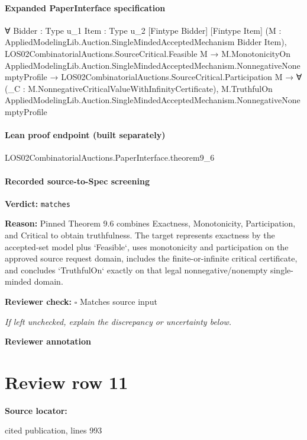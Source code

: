 \documentclass[10pt]{article}
\newcommand{\reviewerbox}{%
  \par\noindent\fbox{\parbox{0.96\linewidth}{\rule{0pt}{0.38in}}}\par
}
\newcommand{\reviewmatch}[1]{%
  \par\noindent\textbf{Reviewer check:} $\square$\; #1\par
  \noindent\emph{If left unchecked, explain the discrepancy or uncertainty below.}\par
}
\begin{document}
\paragraph{Expanded PaperInterface specification}
\begin{ReviewVerbatim}
∀ {Bidder : Type u_1} {Item : Type u_2} [Fintype Bidder] [Fintype Item]
  (M : AppliedModelingLib.Auction.SingleMindedAcceptedMechanism Bidder Item),
  LOS02CombinatorialAuctions.SourceCritical.Feasible M →
    M.MonotonicityOn AppliedModelingLib.Auction.SingleMindedAcceptedMechanism.NonnegativeNonemptyProfile →
      LOS02CombinatorialAuctions.SourceCritical.Participation M →
        ∀ (_C : M.NonnegativeCriticalValueWithInfinityCertificate),
          M.TruthfulOn AppliedModelingLib.Auction.SingleMindedAcceptedMechanism.NonnegativeNonemptyProfile
\end{ReviewVerbatim}



\paragraph{Lean proof endpoint (built separately)}\begin{ReviewVerbatim}
LOS02CombinatorialAuctions.PaperInterface.theorem9_6
\end{ReviewVerbatim}

\paragraph{Recorded source-to-Spec screening}
\textbf{Verdict:} \texttt{matches}
\\
{\raggedright
\textbf{Reason:} Pinned Theorem 9.\allowbreak{}6 combines Exactness, Monotonicity, Participation, and Critical to obtain truthfulness.\allowbreak{} The target represents exactness by the accepted-\allowbreak{}set model plus `Feasible`, uses monotonicity and participation on the approved source request domain, includes the finite-\allowbreak{}or-\allowbreak{}infinite critical certificate, and concludes `TruthfulOn` exactly on that legal nonnegative/\allowbreak{}nonempty single-\allowbreak{}minded domain.\allowbreak{}
\par}
\reviewmatch{Matches source input}
\noindent\textbf{Reviewer annotation}\par
\reviewerbox
\clearpage
\hypertarget{source-claim-7a1b0007541d142b}{}
\section*{Review row 11}
\textbf{Source locator:} {\footnotesize\raggedright cited publication, lines 993\par}
\end{document}
